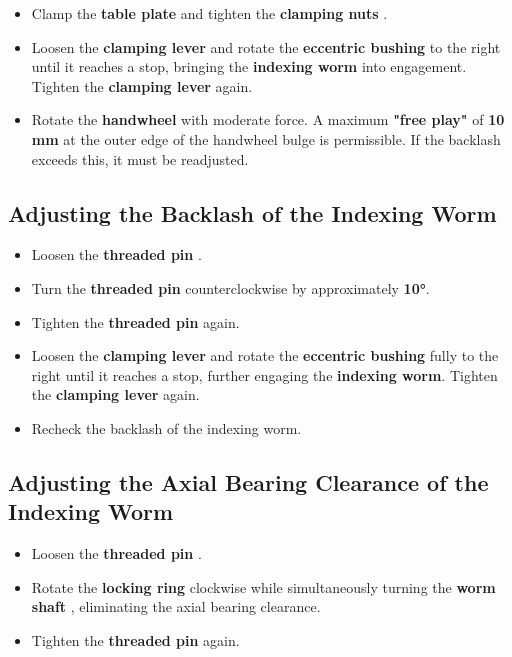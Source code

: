 \begin{itemize}
    \item Clamp the \textbf{table plate} and tighten the \textbf{clamping nuts }.
    \item Loosen the \textbf{clamping lever } and rotate the \textbf{eccentric bushing } to the right until it reaches a stop, bringing the \textbf{indexing worm} into engagement. Tighten the \textbf{clamping lever } again.
    \item Rotate the \textbf{handwheel } with moderate force.  
          A maximum \textbf{"free play"} of \textbf{10 mm} at the outer edge of the handwheel bulge is permissible.  
          If the backlash exceeds this, it must be readjusted.
\end{itemize}

\subsection*{Adjusting the Backlash of the Indexing Worm}

\begin{itemize}
    \item Loosen the \textbf{threaded pin }.
    \item Turn the \textbf{threaded pin } counterclockwise by approximately \textbf{10°}.
    \item Tighten the \textbf{threaded pin } again.
    \item Loosen the \textbf{clamping lever } and rotate the \textbf{eccentric bushing } fully to the right until it reaches a stop, further engaging the \textbf{indexing worm}. Tighten the \textbf{clamping lever } again.
    \item Recheck the backlash of the indexing worm.
\end{itemize}


\newpage

\subsection*{Adjusting the Axial Bearing Clearance of the Indexing Worm}

\begin{itemize}
    \item Loosen the \textbf{threaded pin }.\footnotemark[1]
    \item Rotate the \textbf{locking ring } clockwise while simultaneously turning the \textbf{worm shaft }, eliminating the axial bearing clearance.
    \item Tighten the \textbf{threaded pin } again.
\end{itemize}


